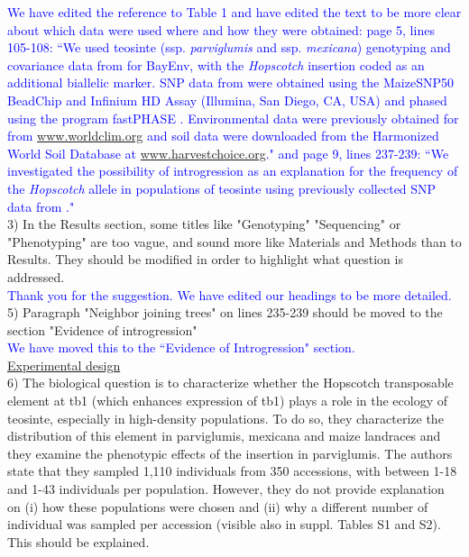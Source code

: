 \documentclass[11pt]{article}
\newcommand{\res}[1]{\noindent \textcolor{blue}{{#1}} \\}
\begin{document}
\res{We have edited the reference to Table 1 and have edited the text to be more clear about which data were used where and how they were obtained: page 5, lines 105-108: ``We used teosinte (ssp. \emph{parviglumis} and ssp. \emph{mexicana}) genotyping and covariance data from \citet{Pyhajarvi2013} for BayEnv, with the \emph{Hopscotch} insertion coded as an additional biallelic marker. SNP data from \citet{Pyhajarvi2013} were obtained using the MaizeSNP50 BeadChip and Infinium HD Assay (Illumina, San Diego, CA, USA) and phased using the program fastPHASE \citep{Scheet2006}. Environmental data were previously obtained for \citet{Pyhajarvi2013} from \url{www.worldclim.org} and soil data were downloaded from the Harmonized World Soil Database \citep{FAOHWSD} at \url{www.harvestchoice.org}." and page 9, lines 237-239: ``We investigated the possibility of introgression as an explanation for the frequency of the \emph{Hopscotch} allele in populations of teosinte using previously collected SNP data from \citep{Pyhajarvi2013}."}

3) In the Results section, some titles like "Genotyping" "Sequencing" or "Phenotyping" are too vague, and sound more like Materials and Methods than to Results. They should be modified in order to highlight what question is addressed.\\

\res{Thank you for the suggestion. We have edited our headings to be more detailed.}

5) Paragraph "Neighbor joining trees" on lines 235-239 should be moved to the section "Evidence of introgression"\\

\res{We have moved this to the ``Evidence of Introgression" section.}

\underline{Experimental design}\\

6) The biological question is to characterize whether the Hopscotch transposable element at tb1 (which enhances expression of tb1) plays a role in the ecology of teosinte, especially in high-density populations. To do so, they characterize the distribution of this element in parviglumis, mexicana and maize landraces and they examine the phenotypic effects of the insertion in parviglumis.
The authors state that they sampled 1,110 individuals from 350 accessions, with between 1-18 and 1-43 individuals per population. However, they do not provide explanation on (i) how these populations were chosen and (ii) why a different number of individual was sampled per accession (visible also in suppl. Tables S1 and S2). This should be explained.\\
\end{document}
